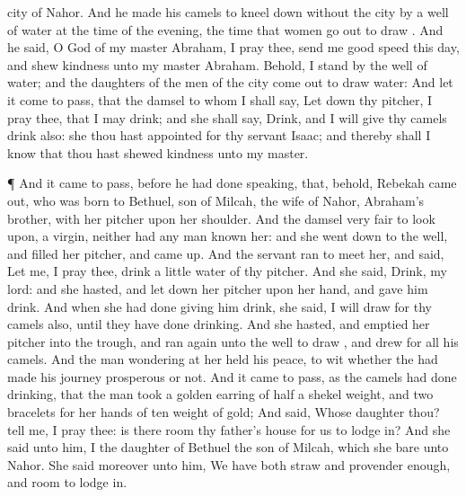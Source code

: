 {city of
Nahor.
And he
made his
camels to kneel
down
without the
city
by a
well of
water at the
time of the
evening,
{} the
time that women go
out to
draw
{}.
And he
said, O
{}
God of my
master
Abraham, I pray thee, send
me good
speed this
day, and
shew
kindness
unto my
master
Abraham.
Behold, I
stand
{} by the
well of
water; and the
daughters of the
men of the
city come
out to
draw
water:
And let it come to pass, that the
damsel to whom I shall
say, Let
down thy
pitcher, I pray thee, that I may
drink; and she shall
say,
Drink, and I will
give thy
camels
drink also:
{} she
{} thou hast
appointed for thy
servant
Isaac; and thereby shall I
know that thou hast
shewed
kindness unto my
master.
\par }{\PP {}¶ And it came to pass, before he had
done
speaking, that, behold,
Rebekah came
out,
who was
born to
Bethuel,
son of
Milcah, the
wife of
Nahor,
Abraham’s
brother, with her
pitcher upon her
shoulder.
And the
damsel
{}
very
fair to look
upon, a
virgin, neither had any
man
known her: and she went
down to the
well, and
filled her
pitcher, and came
up.
And the
servant
ran to meet
her, and
said, Let me, I pray thee,
drink a
little
water of thy
pitcher.
And she
said,
Drink, my
lord: and she
hasted, and let
down her
pitcher upon her
hand, and gave him
drink.
And when she had
done giving him
drink, she
said, I will
draw
{} for thy
camels also, until they have
done
drinking.
And she
hasted, and
emptied her
pitcher into the
trough, and
ran again unto the
well to
draw
{}, and
drew for all his
camels.
And the
man
wondering at her held his
peace, to
wit whether the
{} had
made his
journey
prosperous
or not.
And it came to pass, as the
camels had
done
drinking, that the
man
took a
golden
earring of half a
shekel
weight, and
two
bracelets for her
hands of
ten
{}
weight of
gold;
And
said,
Whose
daughter
{}
thou?
tell me, I pray thee: is
there
room
{} thy
father’s
house for us to lodge
in?
And she
said unto him, I
{} the
daughter of
Bethuel the
son of
Milcah, which she
bare unto
Nahor.
She
said moreover unto him, We have
both
straw and
provender
enough,
and
room to lodge
in.
}
